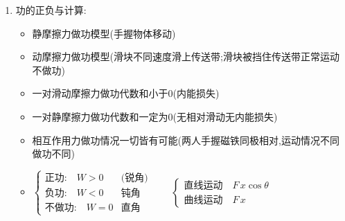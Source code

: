 \documentclass{article}
\begin{document}
\begin{itemize}
\begin{enumerate}
\begin{enumerate}
                            \vspace{-1em}

                      \item 功的正负与计算:

                            \vspace{-1em}

                            \hspace{-1em}\begin{adjustbox}{minipage=0.9\linewidth, bgcolor=gray!20, padding=1em}
                                \small %
                                \begin{itemize}
                                    \item[] 静摩擦力做功模型(手握物体移动)
                                    \item[] 动摩擦力做功模型(滑块不同速度滑上传送带;滑块被挡住传送带正常运动不做功)
                                    \item[] 一对滑动摩擦力做功代数和小于0(内能损失)
                                    \item[] 一对静摩擦力做功代数和一定为$0$(无相对滑动无内能损失)
                                    \item[] 相互作用力做功情况一切皆有可能(两人手握磁铁同极相对,运动情况不同做功不同)
                                \end{itemize}
                            \end{adjustbox}

                            \begin{flushleft}   %
                                \begin{itemize}
                                    \item[]
                                        $
                                            \begin{cases}
                                                \text{正功:} \quad W > 0  & \text{(锐角)} \\
                                                \text{负功:} \quad W < 0  & \text{钝角}   \\
                                                \text{不做功:} \quad W = 0 & \text{直角}
                                            \end{cases}
                                            \hspace{2em}
                                            \begin{cases}
                                                \text{直线运动} \quad F\,x\cos{\theta} \\
                                                \text{曲线运动} \quad F\,x
                                            \end{cases}
                                        $
                                \end{itemize}
                            \end{flushleft}
                  \end{enumerate}


\end{enumerate}
\end{itemize}
\end{document}
